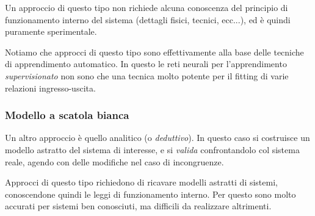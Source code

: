 \documentclass[a4paper,11pt]{article}
\begin{document}
Un approccio di questo tipo non richiede alcuna conoscenza del principio di funzionamento interno del sistema (dettagli fisici, tecnici, ecc...), ed è quindi puramente sperimentale.

Notiamo che approcci di questo tipo sono effettivamente alla base delle tecniche di apprendimento automatico.
In questo le reti neurali per l'apprendimento \textit{supervisionato} non sono che una tecnica molto potente per il fitting di varie relazioni ingresso-uscita.

\subsubsection{Modello a scatola bianca}
Un altro approccio è quello analitico (o \textit{deduttivo}).
In questo caso si costruisce un modello astratto del sistema di interesse, e si \textit{valida} confrontandolo col sistema reale, agendo con delle modifiche nel caso di incongruenze. 

\begin{center}
\end{center}

Approcci di questo tipo richiedono di ricavare modelli astratti di sistemi, conoscendone quindi le leggi di funzionamento interno.
Per questo sono molto accurati per sistemi ben conosciuti, ma difficili da realizzare altrimenti.
\end{document}

